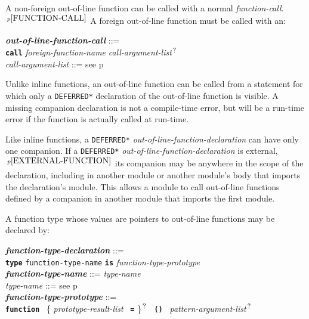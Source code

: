 \documentclass[12pt]{article}
\newcommand{\TT}[1]{{\tt \bfseries #1}}
\newcommand{\QMARK}{{$^{\,\mbox{\footnotesize ?}}$}}
\newcommand{\ttkey}[1]{{\tt \bfseries #1}}
\newcommand{\emkey}[1]{{\em \bfseries #1}}
\newcommand{\pagref}[1]{p\pageref{#1}}
\newcommand{\pagnote}[1]{$\,^{p\pageref{#1}}$}
\newenvironment{indpar}[1][0.3in]%
	{\begin{list}{}%
		     {\setlength{\itemsep}{0in}%
		      \setlength{\topsep}{0in}%
		      \setlength{\parsep}{1ex}%
		      \setlength{\labelwidth}{#1}%
		      \setlength{\leftmargin}{#1}%
		      \addtolength{\leftmargin}{\labelsep}}%
	 \item}%
	{\end{list}}
\begin{document}
A non-foreign out-of-line function can be called with a normal
{\em function-call}.\pagnote{FUNCTION-CALL}  A foreign
out-of-line function must be called with an:
\begin{indpar}
\emkey{out-of-line-function-call}%
	\label{OUT-OF-LINE-FUNCTION-CALL} ::= \\
\hspace*{0.25in}
	\ttkey{call} {\em foreign-function-name}
	     {\em call-argument-list}\QMARK{}
\\[0.5ex]
{\em call-argument-list} ::= see \pagref{CALL-ARGUMENT-LIST}
\end{indpar}

Unlike inline functions, an out-of-line function can
be called from a statement for which only a {\tt *DEFERRED*} declaration
of the out-of-line function is visible.  A missing companion
declaration is not a compile-time error, but will be a
run-time error if the function is actually called at run-time.

Like inline functions, a {\tt *DEFERRED*} {\em out-of-line-function-declaration}
can have only one companion.
If\label{OUT-OF-LINE-EXTERNAL-COMPANION}
a {\tt *DEFERRED*} {\em out-of-line-function-declaration}
is external,\pagnote{EXTERNAL-FUNCTION}
its companion may be anywhere in the scope of the declaration,
including in another module or another module's body that imports
the declaration's module.
This allows a module to call out-of-line functions defined by
a companion in another module that imports the first module.

A function type whose values are pointers to out-of-line
functions may be declared by:

\begin{indpar}
\emkey{function-type-declaration}\label{FUNCTION-TYPE-DECLARATION} ::= \\
\hspace*{0.5in}
    \ttkey{type} {\tt function-type-name} \TT{is}
                 {\em function-type-prototype}
\\[0.5ex]
\emkey{function-type-name} ::= {\em type-name}
\\[0.5ex]
{\em type-name} ::= see \pagref{TYPE-NAME}
\\[0.5ex]
\emkey{function-type-prototype}%
	\label{FUNCTION-TYPE-PROTOTYPE} ::= \\
\hspace*{0.25in} \ttkey{function}~
        \{ {\em prototype-result-list}~ \TT{=} \}\QMARK{}~
	\TT{()}~ {\em pattern-argument-list}\QMARK{}
\end{indpar}
\end{document}
